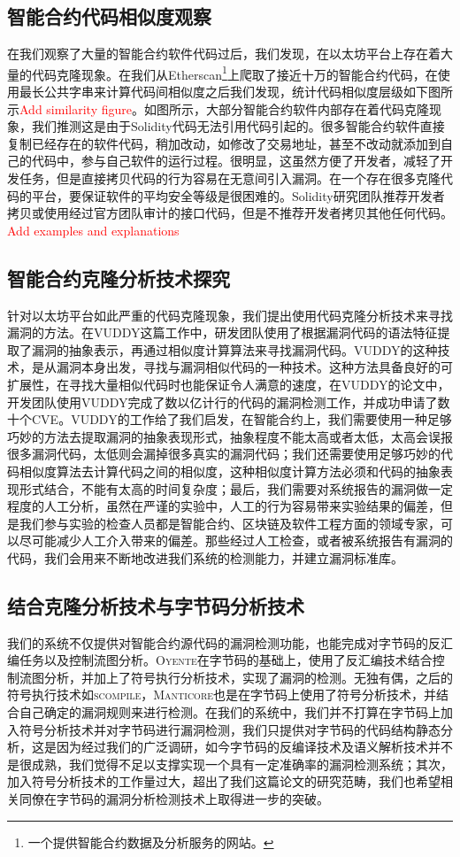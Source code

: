 \subsection{智能合约代码相似度观察}
在我们观察了大量的智能合约软件代码过后，我们发现，在以太坊平台上存在着大量的代码克隆现象。在我们从Etherscan\footnote{一个提供智能合约数据及分析服务的网站。}上爬取了接近十万的智能合约代码，在使用最长公共字串来计算代码间相似度之后我们发现，统计代码相似度层级如下图所示\textcolor{red}{Add similarity figure}。如图所示，大部分智能合约软件内部存在着代码克隆现象，我们推测这是由于Solidity代码无法引用代码引起的。很多智能合约软件直接复制已经存在的软件代码，稍加改动，如修改了交易地址，甚至不改动就添加到自己的代码中，参与自己软件的运行过程。很明显，这虽然方便了开发者，减轻了开发任务，但是直接拷贝代码的行为容易在无意间引入漏洞。在一个存在很多克隆代码的平台，要保证软件的平均安全等级是很困难的。Solidity研究团队推荐开发者拷贝或使用经过官方团队审计的接口代码，但是不推荐开发者拷贝其他任何代码。\textcolor{red}{Add examples and explanations}

\subsection{智能合约克隆分析技术探究}
针对以太坊平台如此严重的代码克隆现象，我们提出使用代码克隆分析技术来寻找漏洞的方法。在VUDDY\cite{vuddy}这篇工作中，研发团队使用了根据漏洞代码的语法特征提取了漏洞的抽象表示，再通过相似度计算算法来寻找漏洞代码。VUDDY的这种技术，是从漏洞本身出发，寻找与漏洞相似代码的一种技术。这种方法具备良好的可扩展性，在寻找大量相似代码时也能保证令人满意的速度，在VUDDY的论文中，开发团队使用VUDDY完成了数以亿计行的代码的漏洞检测工作，并成功申请了数十个CVE。VUDDY的工作给了我们启发，在智能合约上，我们需要使用一种足够巧妙的方法去提取漏洞的抽象表现形式，抽象程度不能太高或者太低，太高会误报很多漏洞代码，太低则会漏掉很多真实的漏洞代码；我们还需要使用足够巧妙的代码相似度算法去计算代码之间的相似度，这种相似度计算方法必须和代码的抽象表现形式结合，不能有太高的时间复杂度；最后，我们需要对系统报告的漏洞做一定程度的人工分析，虽然在严谨的实验中，人工的行为容易带来实验结果的偏差，但是我们参与实验的检查人员都是智能合约、区块链及软件工程方面的领域专家，可以尽可能减少人工介入带来的偏差。那些经过人工检查，或者被系统报告有漏洞的代码，我们会用来不断地改进我们系统的检测能力，并建立漏洞标准库。

\subsection{结合克隆分析技术与字节码分析技术}
我们的系统不仅提供对智能合约源代码的漏洞检测功能，也能完成对字节码的反汇编任务以及控制流图分析。\textsc{Oyente}\cite{oyente}在字节码的基础上，使用了反汇编技术结合控制流图分析，并加上了符号执行分析技术，实现了漏洞的检测。无独有偶，之后的符号执行技术如\textsc{scompile}\cite{scompile}，\textsc{Manticore}\cite{manticore}也是在字节码上使用了符号分析技术，并结合自己确定的漏洞规则来进行检测。在我们的系统中，我们并不打算在字节码上加入符号分析技术并对字节码进行漏洞检测，我们只提供对字节码的代码结构静态分析，这是因为经过我们的广泛调研，如今字节码的反编译技术及语义解析技术并不是很成熟，我们觉得不足以支撑实现一个具有一定准确率的漏洞检测系统；其次，加入符号分析技术的工作量过大，超出了我们这篇论文的研究范畴，我们也希望相关同僚在字节码的漏洞分析检测技术上取得进一步的突破。

